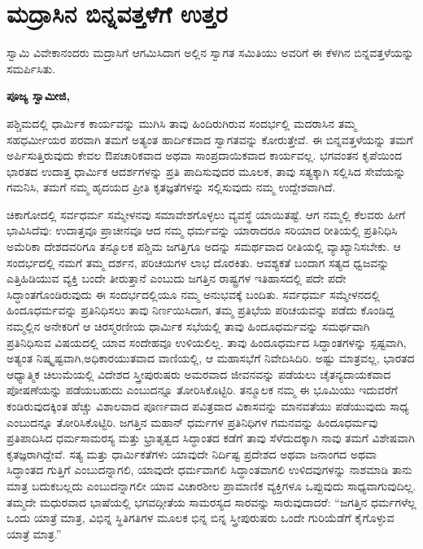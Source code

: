 
\chapter{ಮದ್ರಾಸಿನ ಬಿನ್ನವತ್ತಳೆಗೆ ಉತ್ತರ}

ಸ್ವಾಮಿ ವಿವೇಕಾನಂದರು ಮದ್ರಾಸಿಗೆ ಆಗಮಿಸಿದಾಗ ಅಲ್ಲಿನ ಸ್ವಾಗತ ಸಮಿತಿಯು ಅವರಿಗೆ ಈ ಕೆಳಗಿನ ಬಿನ್ನವತ್ತಳೆಯನ್ನು ಸಮರ್ಪಿಸಿತು.

\textbf{ಪೂಜ್ಯ ಸ್ವಾಮೀಜಿ,}

ಪಶ್ಚಿಮದಲ್ಲಿ ಧಾರ್ಮಿಕ ಕಾರ್ಯವನ್ನು ಮುಗಿಸಿ ತಾವು ಹಿಂದಿರುಗಿರುವ ಸಂದರ್ಭಲ್ಲಿ ಮದರಾಸಿನ ತಮ್ಮ ಸಹಧರ್ಮೀಯರ ಪರವಾಗಿ ತಮಗೆ ಅತ್ಯಂತ ಹಾರ್ದಿಕವಾದ ಸ್ವಾಗತವನ್ನು ಕೋರುತ್ತೇವೆ. ಈ ಬಿನ್ನವತ್ತಳೆಯನ್ನು ತಮಗೆ ಅರ್ಪಿಸುತ್ತಿರುವುದು ಕೇವಲ ಔಪಚಾರಿಕವಾದ ಅಥವಾ ಸಾಂಪ್ರದಾಯಿಕವಾದ ಕಾರ್ಯವಲ್ಲ. ಭಗವಂತನ ಕೃಪೆಯಿಂದ ಭಾರತದ ಉದಾತ್ತ ಧಾರ್ಮಿಕ ಆದರ್ಶಗಳನ್ನು ಪ್ರತಿ ಪಾದಿಸುವುದರ ಮೂಲಕ, ತಾವು ಸತ್ಯಕ್ಕಾಗಿ ಸಲ್ಲಿಸಿದ ಸೇವೆಯನ್ನು ಗಮನಿಸಿ, ತಮಗೆ ನಮ್ಮ ಹೃದಯದ ಪ್ರೀತಿ ಕೃತಜ್ಞತೆಗಳನ್ನು ಸಲ್ಲಿಸುವುದು ನಮ್ಮ ಉದ್ದೇಶವಾಗಿದೆ.

ಚಿಕಾಗೋದಲ್ಲಿ ಸರ್ವಧರ್ಮ ಸಮ್ಮೇಳನವು ಸಮಾವೇಶಗೊಳ್ಳಲು ವ್ಯವಸ್ಥೆ ಯಾಯಿತಷ್ಟೆ. ಆಗ ನಮ್ಮಲ್ಲಿ ಕೆಲವರು ಹೀಗೆ ಭಾವಿಸಿದೆವು: ಉದಾತ್ತವೂ ಪ್ರಾಚೀನವೂ ಆದ ನಮ್ಮ ಧರ್ಮವನ್ನು ಯಾರಾದರೂ ಸರಿಯಾದ ರೀತಿಯಲ್ಲಿ ಪ್ರತಿನಿಧಿಸಿ ಅಮೆರಿಕಾ ದೇಶದವರಿಗೂ ತನ್ಮೂಲಕ ಪಶ್ಚಿಮ ಜಗತ್ತಿಗೂ ಅದನ್ನು ಸಮರ್ಥವಾದ ರೀತಿಯಲ್ಲಿ ವ್ಯಾಖ್ಯಾನಿಸಬೇಕು. ಆ ಸಂದರ್ಭದಲ್ಲಿ ನಮಗೆ ತಮ್ಮ ದರ್ಶನ, ಪರಿಚಯಗಳ ಲಾಭ ದೊರಕಿತು. ಆವಶ್ಯಕತೆ ಬಂದಾಗ ಸತ್ಯದ ಧ್ವಜವನ್ನು ಎತ್ತಿಹಿಡಿಯುವ ವ್ಯಕ್ತಿ ಬಂದೇ ತೀರುತ್ತಾನೆ ಎಂಬುದು ಜಗತ್ತಿನ ರಾಷ್ಟ್ರಗಳ ಇತಿಹಾಸದಲ್ಲಿ ಪದೇ ಪದೇ ಸಿದ್ಧಾಂತಗೊಂಡಿರುವುದು ಈ ಸಂದರ್ಭದಲ್ಲಿಯೂ ನಮ್ಮ ಅನುಭವಕ್ಕೆ ಬಂದಿತು. ಸರ್ವಧರ್ಮ ಸಮ್ಮೇಳನದಲ್ಲಿ ಹಿಂದೂಧರ್ಮವನ್ನು ಪ್ರತಿನಿಧಿಸಲು ತಾವು ನಿರ್ಣಯಿಸಿದಾಗ, ತಮ್ಮ ಪ್ರತಿಭೆಯ ಪರಿಚಯವನ್ನು ಪಡೆದು ಕೊಂಡಿದ್ದ ನಮ್ಮಲ್ಲಿನ ಅನೇಕರಿಗೆ ಆ ಚಿರಸ್ಮರಣೀಯ ಧಾರ್ಮಿಕ ಸಭೆಯಲ್ಲಿ ತಾವು ಹಿಂದೂಧರ್ಮವನ್ನು ಸಮರ್ಥವಾಗಿ ಪ್ರತಿನಿಧಿಸುವ ವಿಷಯದಲ್ಲಿ ಯಾವ ಸಂದೇಹವೂ ಉಳಿಯಲಿಲ್ಲ. ತಾವು ಹಿಂದೂಧರ್ಮದ ಸಿದ್ಧಾಂತಗಳನ್ನು ಸ್ಪಷ್ಟವಾಗಿ, ಅತ್ಯಂತ ನಿಷ್ಕೃಷ್ಟವಾಗಿ,\break ಅಧಿಕಾರಯುತವಾದ ವಾಣಿಯಲ್ಲಿ, ಆ ಮಹಾಸಭೆಗೆ ನಿವೇದಿಸಿದಿರಿ. ಅಷ್ಟು ಮಾತ್ರವಲ್ಲ, ಭಾರತದ ಆಧ್ಯಾತ್ಮಿಕ ಚಿಲುಮೆಯಲ್ಲಿ ವಿದೇಶದ ಸ್ತ್ರೀಪುರುಷರು ಅಮರವಾದ ಜೀವನವನ್ನು ಪಡೆಯಲು ಚೈತನ್ಯದಾಯಕವಾದ ಪೋಷಣೆಯನ್ನು ಪಡೆಯಬಹುದು ಎಂಬುದನ್ನೂ ತೋರಿಸಿಕೊಟ್ಟಿರಿ. ತನ್ಮೂಲಕ ನಮ್ಮ ಈ ಭೂಮಿಯು ಇದುವರೆಗೆ ಕಂಡಿರುವುದಕ್ಕಿಂತ ಹೆಚ್ಚು ವಿಶಾಲವಾದ ಪೂರ್ಣವಾದ ಪವಿತ್ರವಾದ ವಿಕಾಸವನ್ನು ಮಾನವತೆಯು ಪಡೆಯುವುದು ಸಾಧ್ಯ ಎಂಬುದನ್ನೂ ತೋರಿಸಿಕೊಟ್ಟಿರಿ. ಜಗತ್ತಿನ ಮಹಾನ್​ ಧರ್ಮಗಳ ಪ್ರತಿನಿಧಿಗಳ ಗಮನವನ್ನು ಹಿಂದೂಧರ್ಮವು ಪ್ರತಿಪಾದಿಸಿದ ಧರ್ಮಸಾಮರಸ್ಯ ಮತ್ತು ಭ್ರಾತೃತ್ವದ ಸಿದ್ಧಾಂತದ ಕಡೆಗೆ ತಾವು ಸೆಳೆದುದಕ್ಕಾಗಿ ನಾವು ತಮಗೆ ವಿಶೇಷವಾಗಿ ಕೃತಜ್ಞರಾಗಿದ್ದೇವೆ. ಸತ್ಯ ಮತ್ತು ಧಾರ್ಮಿಕತೆಗಳು ಯಾವುದೇ ನಿರ್ದಿಷ್ಟ ಪ್ರದೇಶದ ಅಥವಾ ಜನಾಂಗದ ಅಥವಾ ಸಿದ್ಧಾಂತದ ಗುತ್ತಿಗೆ ಎಂಬುದನ್ನಾಗಲಿ, ಯಾವುದೇ ಧರ್ಮವಾಗಲಿ ಸಿದ್ಧಾಂತವಾಗಲಿ ಉಳಿದವುಗಳನ್ನು ನಾಶಮಾಡಿ ತಾನು ಮಾತ್ರ ಬದುಕಬಲ್ಲದು ಎಂಬುದನ್ನಾಗಲೀ ಯಾವ ವಿಚಾರಶೀಲ ಪ್ರಾಮಾಣಿಕ ವ್ಯಕ್ತಿಗಳೂ ಒಪ್ಪುವುದು ಸಾಧ್ಯವಾಗುವುದಿಲ್ಲ. ತಮ್ಮದೇ ಮಧುರವಾದ ಭಾಷೆಯಲ್ಲಿ ಭಗವದ್ಗೀತೆಯ ಸಾಮರಸ್ಯದ ಸಾರವನ್ನು ಸಾರುವುದಾದರೆ: “ಜಗತ್ತಿನ ಧರ್ಮಗಳೆಲ್ಲ ಒಂದು ಯಾತ್ರೆ ಮಾತ್ರ, ವಿಭಿನ್ನ ಸ್ಥಿತಿಗತಿಗಳ ಮೂಲಕ ಭಿನ್ನ ಬಿನ್ನ ಸ್ತ್ರೀಪುರುಷರು ಒಂದೇ ಗುರಿಯೆಡೆಗೆ ಕೈಗೊಳ್ಳುವ ಯಾತ್ರೆ ಮಾತ್ರ.”

